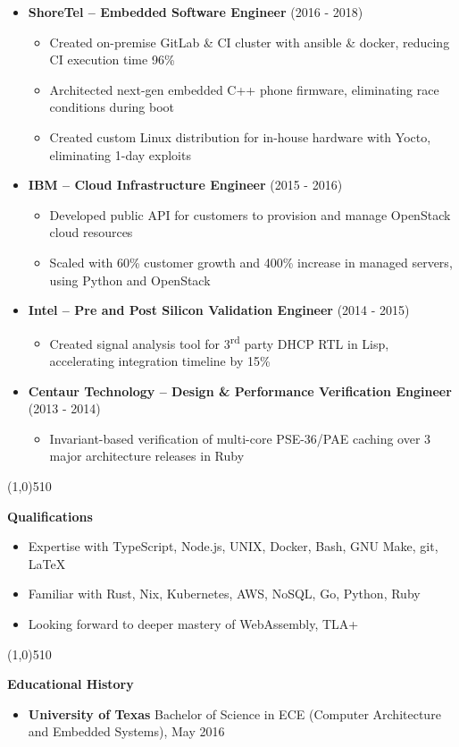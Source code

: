 \documentclass{report}
\newcommand{\cut}{\begin{center} \line(1,0){510} \end{center}}
\begin{document}
\begin{itemize}[label=]
\item \textbf{ShoreTel -- Embedded Software Engineer} (2016 - 2018)
  \begin{itemize}[label=$\circ$]
  \item Created on-premise GitLab \& CI cluster with ansible \& docker, reducing CI execution time 96\%
  \item Architected next-gen embedded C++ phone firmware, eliminating race conditions during boot
  \item Created custom Linux distribution for in-house hardware with Yocto, eliminating 1-day exploits
  \end{itemize}

\item \textbf{IBM -- Cloud Infrastructure Engineer} (2015 - 2016)
  \begin{itemize}[label=$\circ$]
  \item Developed public API for customers to provision and manage OpenStack cloud resources
  \item Scaled with 60\% customer growth and 400\% increase in managed servers, using Python and OpenStack
  \end{itemize}

\item \textbf{Intel -- Pre and Post Silicon Validation Engineer} (2014 - 2015)
  \begin{itemize}[label=$\circ$]
  \item Created signal analysis tool for 3\textsuperscript{rd} party DHCP RTL in Lisp, accelerating integration timeline by 15\%
  \end{itemize}

\item \textbf{Centaur Technology -- Design \& Performance Verification Engineer} (2013 - 2014)
  \begin{itemize}[label=$\circ$]
  \item Invariant-based verification of multi-core PSE-36/PAE caching over 3 major architecture releases in Ruby
  \end{itemize}

\end{itemize}

\cut{}

\textbf{Qualifications}
\begin{itemize}[label=$\cdot$]
\item Expertise with TypeScript, Node.js, UNIX, Docker, Bash, GNU Make, git, \LaTeX{}
\item Familiar with Rust, Nix, Kubernetes, AWS, NoSQL, Go, Python, Ruby
\item Looking forward to deeper mastery of WebAssembly, TLA+
\end{itemize}

\cut{}

\textbf{Educational History}
\begin{itemize}[label=$\cdot$]
\item \textbf{University of Texas} Bachelor of Science in ECE (Computer Architecture and Embedded Systems), May 2016
\end{itemize}
\end{document}
